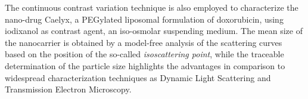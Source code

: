  

The continuous contrast variation technique is also employed to characterize the nano-drug Caelyx, a PEGylated liposomal formulation of doxorubicin, using iodixanol as contrast agent, an iso-osmolar suspending medium. The mean size of the nanocarrier is obtained by a model-free analysis of the scattering curves based on the position of the so-called \emph{isoscattering point}, while the traceable determination of the particle size highlights the advantages in comparison to widespread characterization techniques as Dynamic Light Scattering and Transmission Electron Microscopy.




